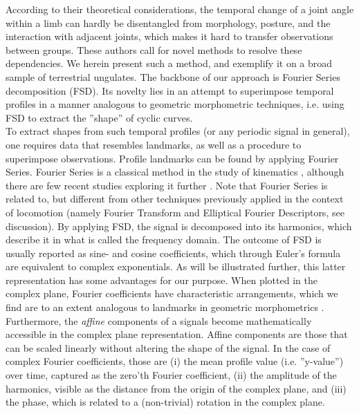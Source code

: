 \documentclass[10pt, a4paper]{article}
\begin{document}
\begin{linenumbers}[1]
According to their theoretical considerations, the temporal change of a joint angle within a limb can hardly be disentangled from morphology, posture, and the interaction with adjacent joints, which makes it hard to transfer observations between groups. 
These authors call for novel methods to resolve these dependencies. 
We herein present such a method, and exemplify it on a broad sample of terrestrial ungulates. 
The backbone of our approach is Fourier Series decomposition (FSD). 
Its novelty lies in an attempt to superimpose temporal profiles in a manner analogous to geometric morphometric techniques, i.e. using FSD to extract the ''shape'' of cyclic curves.
\medskip\\To extract shapes from such temporal profiles (or any periodic signal in general), one requires data that resembles landmarks, as well as a procedure to superimpose observations.
Profile landmarks can be found by applying Fourier Series. 
Fourier Series is a classical method in the study of kinematics \citep{Bernstein1927a,Bernstein1935}, although there are few recent studies exploring it further \citep{vanWeeren1992,Grasso2000,Webb2007}. 
Note that Fourier Series is related to, but different from other techniques previously applied in the context of locomotion (namely Fourier Transform and Elliptical Fourier Descriptors, see discussion). 
By applying FSD, the signal is decomposed into its harmonics, which describe it in what is called the frequency domain. 
The outcome of FSD is usually reported as sine- and cosine coefficients, which through Euler's formula are equivalent to complex exponentials. 
As will be illustrated further, this latter representation has some advantages for our purpose. 
When plotted in the complex plane, Fourier coefficients have characteristic arrangements, which we find are to an extent analogous to landmarks in geometric morphometrics \citep{Bookstein1991,Kendall1989}. 
Furthermore, the \textit{affine} components of a signals become mathematically accessible in the complex plane representation. 
Affine components are those that can be scaled linearly without altering the shape of the signal. 
In the case of complex Fourier coefficients, those are (i) the mean profile value (i.e. ''y-value'') over time, captured as the zero'th Fourier coefficient, (ii) the amplitude of the harmonics, visible as the distance from the origin of the complex plane, and (iii) the phase, which is related to a (non-trivial) rotation in the complex plane. 

\end{linenumbers}
\end{document}
